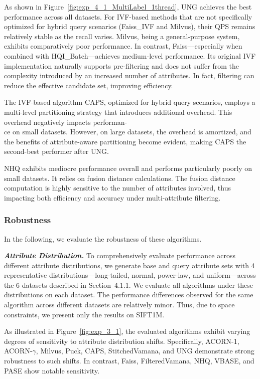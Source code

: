 \documentclass[sigconf, nonacm]{acmart}
\begin{document}
	As shown in Figure~\ref{fig:exp_4_1_MultiLabel_1thread}, UNG achieves the best performance across all datasets. For IVF-based methods that are not specifically optimized for hybrid query scenarios (Faiss\_IVF and Milvus), their QPS remains relatively stable as the recall varies. Milvus, being a general-purpose system, exhibits comparatively poor performance. In contrast, Faiss—especially when combined with HQI\_Batch—achieves medium-level performance. Its original IVF implementation naturally supports pre-filtering and does not suffer from the complexity introduced by an increased number of attributes. In fact, filtering can reduce the effective candidate set, improving efficiency.
	
	The IVF-based algorithm CAPS, optimized for hybrid query scenarios, employs a multi-level partitioning strategy that introduces additional overhead. This overhead negatively impacts performan-\\ce on small datasets. However, on large datasets, the overhead is amortized, and the benefits of attribute-aware partitioning become evident, making CAPS the second-best performer after UNG.
	
	NHQ exhibits mediocre performance overall and performs particularly poorly on small datasets. It relies on fusion distance calculations. The fusion distance computation is highly sensitive to the number of attributes involved, thus impacting both efficiency and accuracy under multi-attribute filtering.
	
	
	
	
	\subsubsection{Robustness}In the following, we evaluate the robustness of these algorithms.
	
	\textit{\textbf{Attribute Distribution.}} To comprehensively evaluate performance across different attribute distributions, we generate base and query attribute sets with 4 representative distributions—long-tailed, normal, power-law, and uniform—across the 6 datasets described in Section~4.1.1. We evaluate all algorithms under these distributions on each dataset. The performance differences observed for the same algorithm across different datasets are relatively minor. Thus, due to space constraints, we present only the results on SIFT1M.
	
	As illustrated in Figure~\ref{fig:exp_3_1}, the evaluated algorithms exhibit varying degrees of sensitivity to attribute distribution shifts. Specifically, ACORN-1, ACORN-$\gamma$, Milvus, Puck, CAPS, StitchedVamana, and UNG demonstrate strong robustness to such shifts. In contrast, Faiss, FilteredVamana, NHQ, VBASE, and PASE show notable sensitivity.
	
\end{document}
